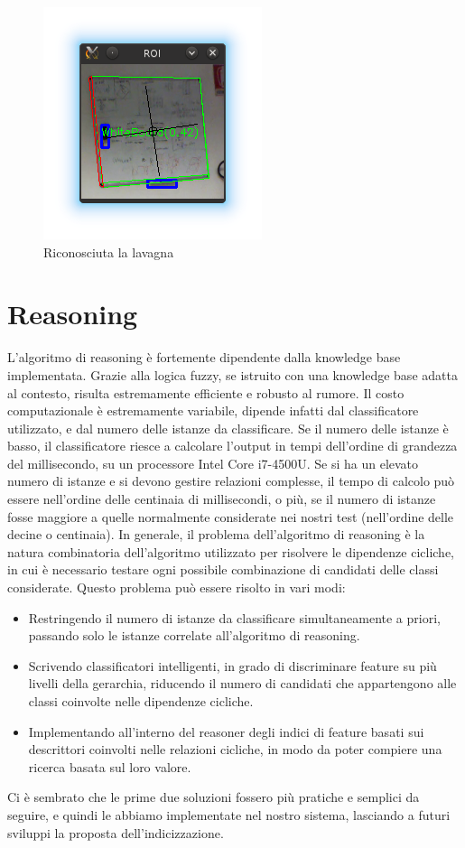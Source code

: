 \begin{figure}[ht]
  \includegraphics{immagini/risultati/recognition2}
  \caption[Riconoscimento della lavagna]{Riconosciuta la lavagna}
  \label{fig:recognition2}
\end{figure}





\section{Reasoning}
L'algoritmo di reasoning è fortemente dipendente dalla knowledge base implementata. Grazie alla logica fuzzy, se istruito con una knowledge base adatta al contesto, risulta estremamente efficiente e robusto al rumore. Il costo computazionale è estremamente variabile, dipende infatti dal classificatore utilizzato, e dal numero delle istanze da classificare. Se il numero delle istanze è basso, il classificatore riesce a calcolare l'output in tempi dell'ordine di grandezza del millisecondo, su un processore Intel Core i7-4500U.
Se si ha un elevato numero di istanze e si devono gestire relazioni complesse, il tempo di calcolo può essere nell'ordine delle centinaia di millisecondi, o più, se il numero di istanze fosse maggiore a quelle normalmente considerate nei nostri test (nell'ordine delle decine o centinaia).
In generale, il problema dell'algoritmo di reasoning è la natura combinatoria dell'algoritmo utilizzato per risolvere le dipendenze cicliche, in cui è necessario testare ogni possibile combinazione di candidati delle classi considerate. Questo problema può essere risolto in vari modi: 
\begin{itemize}
 \item Restringendo il numero di istanze da classificare simultaneamente a priori, passando solo le istanze correlate all'algoritmo di reasoning.
 \item Scrivendo classificatori intelligenti, in grado di discriminare feature su più livelli della gerarchia, riducendo il numero di candidati che appartengono alle classi coinvolte nelle dipendenze cicliche.
 \item Implementando all'interno del reasoner degli indici di feature basati sui descrittori coinvolti nelle relazioni cicliche, in modo da poter compiere una ricerca basata sul loro valore.
\end{itemize}
Ci è sembrato che le prime due soluzioni fossero più pratiche e semplici da seguire, e quindi le abbiamo implementate nel nostro sistema, lasciando a futuri sviluppi la proposta dell'indicizzazione.

